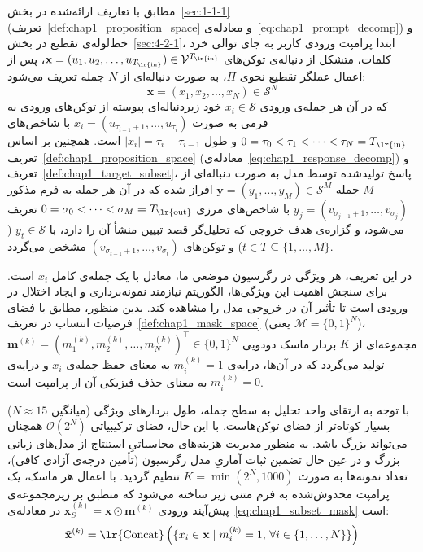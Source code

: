 مطابق با تعاریف ارائه‌شده در بخش~\ref{sec:1-1-1} (تعریف~\ref{def:chap1_proposition_space} و معادله‌ی~\ref{eq:chap1_prompt_decomp}) و خط‌لوله‌ی تقطیع در بخش~\ref{sec:4-2-1}، ابتدا پرامپت ورودی کاربر به جای توالی خرد کلمات، متشکل از دنباله‌ی توکن‌های $\mathbf{x} = (u_1, u_2, \dots, u_{T_{\text{\lr{in}}}}) \in \mathcal{V}^{T_{\text{\lr{in}}}}$، پس از اعمال عملگر تقطیع نحوی $\Pi$، به صورت دنباله‌ای از $N$ جمله تعریف می‌شود:
\begin{equation}\label{eq:app_prompt_decomp}
    \mathbf{x} = (x_1, x_2, \dots, x_N) \in \mathcal{S}^N
\end{equation}
که در آن هر جمله‌ی ورودی $x_i \in \mathcal{S}$ خود زیردنباله‌ای پیوسته از توکن‌های ورودی به فرمی به صورت $x_i = (u_{\tau_{i-1}+1}, \dots, u_{\tau_i})$ با شاخص‌های $0 = \tau_0 < \tau_1 < \cdots < \tau_N = T_{\text{\lr{in}}}$ و طول $|x_i| = \tau_i - \tau_{i-1}$ است. همچنین بر اساس تعریف~\ref{def:chap1_proposition_space} (معادله‌ی~\ref{eq:chap1_response_decomp}) و تعریف~\ref{def:chap1_target_subset}، پاسخ تولیدشده توسط مدل به صورت دنباله‌ای از $M$ جمله $\mathbf{y} = (y_1, \dots, y_M) \in \mathcal{S}^M$ افراز شده که در آن هر جمله به فرم مذکور $y_j = (v_{\sigma_{j-1}+1}, \dots, v_{\sigma_j})$ با شاخص‌های مرزی $0 = \sigma_0 < \cdots < \sigma_M = T_{\text{\lr{out}}}$ تعریف می‌شود، و گزاره‌ی هدف خروجی که تحلیل‌گر قصد تبیین منشأ آن را دارد، با $y_t \in \mathcal{S}$ ($t \in T \subseteq \{1, \dots, M\}$) و توکن‌های $(v_{\sigma_{t-1}+1}, \dots, v_{\sigma_t})$ مشخص می‌گردد.

در این تعریف، هر ویژگی در رگرسیون موضعی ما، معادل با یک جمله‌ی کامل $x_i$ است. برای سنجش اهمیت این ویژگی‌ها، الگوریتم  نیازمند نمونه‌برداری و ایجاد اختلال در ورودی است تا تأثیر آن در خروجی مدل را مشاهده کند. بدین منظور، مطابق با فضای فرضیات انتساب در تعریف~\ref{def:chap1_mask_space} (یعنی $\mathcal{M} = {\{0, 1\}}^N$)، مجموعه‌ای از $K$ بردار ماسک دودویی $\mathbf{m}^{(k)} = {(m_1^{(k)}, m_2^{(k)}, \dots, m_N^{(k)})}^\top \in {\{0, 1\}}^N$ تولید می‌گردد که در آن‌ها، درایه‌ی $m_i^{(k)} = 1$ به معنای حفظ جمله‌ی $x_i$ و درایه‌ی $m_i^{(k)} = 0$ به معنای حذف فیزیکی آن از پرامپت است.

با توجه به ارتقای واحد تحلیل به سطح جمله، طول بردارهای ویژگی (میانگین $N \approx 15$) بسیار کوتاه‌تر از فضای توکن‌هاست. با این حال، فضای ترکیبیاتی $\mathcal{O}(2^N)$ همچنان می‌تواند بزرگ باشد. به منظور مدیریت هزینه‌های محاسباتیِ استنتاج از مدل‌های زبانی بزرگ و در عین حال تضمین ثبات آماریِ مدل رگرسیون (تأمین درجه‌ی آزادی کافی)، تعداد نمونه‌ها به صورت $K = \min(2^N, 1000)$ تنظیم گردید. با اعمال هر ماسک، یک پرامپت مخدوش‌شده به فرم متنی زیر ساخته می‌شود که منطبق بر زیرمجموعه‌ی پیش‌آیند ورودی $\mathbf{x}_S^{(k)} = \mathbf{x} \odot \mathbf{m}^{(k)}$ در معادله‌ی~\ref{eq:chap1_subset_mask} است:
\begin{equation}\label{eq:app_lime_perturbed_text}
    \tilde{\mathbf{x}}^{(k)} = \text{\lr{Concat}}\left( \{x_i \in \mathbf{x} \mid m_i^{(k)} = 1, \, \forall i \in \{1, \dots, N\} \} \right)
\end{equation}

